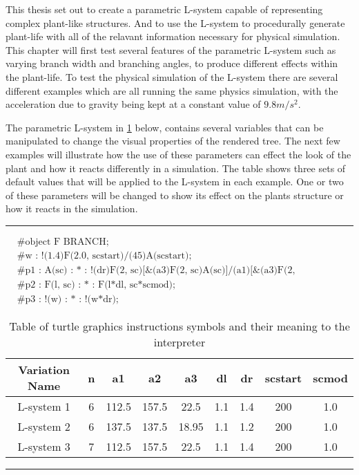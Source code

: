 This thesis set out to create a parametric L-system capable of representing complex plant-like structures. And to use the L-system to procedurally generate plant-life with all of the relavant information necessary for physical simulation. This chapter will first test several features of the parametric L-system such as varying branch width and branching angles, to produce different effects within the plant-life. To test the physical simulation of the L-system there are several different examples which are all running the same physics simulation, with the acceleration due to gravity being kept at a constant value of $9.8m/s^2$. 

The parametric L-system in \ref{L-system params} below, contains several variables that can be manipulated to change the visual properties of the rendered tree. The next few examples will illustrate how the use of these parameters can effect the look of the plant and how it reacts differently in a simulation. The table shows three sets of default values that will be applied to the L-system in each example. One or two of these parameters will be changed to show its effect on the plants structure or how it reacts in the simulation.

\vspace{10mm}
\hrule
\begin{singlespace}
\begin{equation}
\begin{aligned}
	&\textrm{\#object F BRANCH;}\\
	&\textrm{\#w : !(1.4)F(2.0, scstart)/(45)A(scstart);}\\
	&\textrm{\#p1 : A(sc) : * : !(dr)F(2, sc)[\&(a3)F(2, sc)A(sc)]/(a1)[\&(a3)F(2, sc)A(sc)]/(a2)[\&(a3)F(2, sc)A(sc)];}\\
	&\textrm{\#p2 : F(l, sc) : * : F(l*dl, sc*scmod);}\\
	&\textrm{\#p3 : !(w) : * : !(w*dr);}
\end{aligned}
\end{equation}
\end{singlespace}

\begin{table}[h!]
\centering
\begin{tabular}{ | c | c | c | c | c | c | c | c | c | }
\hline
	Variation Name & n & a1 & a2 & a3 & dl & dr & scstart & scmod\\  
\hline
\hline
	L-system 1  & 6 & 112.5 & 157.5 & 22.5 & 1.1 & 1.4 & 200 & 1.0 \\
\hline
	L-system 2  & 6 & 137.5 & 137.5 & 18.95 & 1.1 & 1.2 & 200 & 1.0 \\
\hline
	L-system 3  & 7 & 112.5 & 157.5 & 22.5 & 1.1 & 1.4 & 200 & 1.0 \\
\hline
\end{tabular}
\caption{Table of turtle graphics instructions symbols and their meaning to the interpreter}
\label{L-system params}
\end{table}
\FloatBarrier
\hrule

